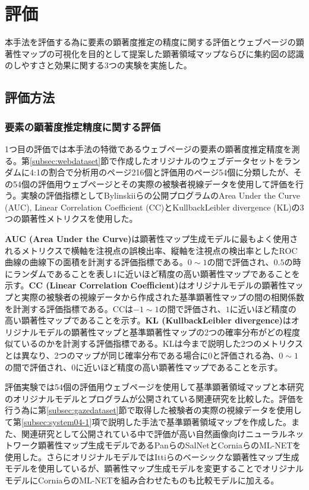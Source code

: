 \newpage
\renewcommand{\baselinestretch}{1.5}
\section{評価}\label{sec:evaluation}
\renewcommand{\baselinestretch}{1}
\par 本手法を評価する為に要素の顕著度推定の精度に関する評価とウェブページの顕著性マップの可視化を目的として提案した顕著領域マップならびに集約図の認識のしやすさと効果に関する3つの実験を実施した。

\subsection{評価方法}
\subsubsection{要素の顕著度推定精度に関する評価}
\par 1つ目の評価では本手法の特徴であるウェブページの要素の顕著度推定精度を測る。第\ref{subsec:webdataset}節で作成したオリジナルのウェブデータセットをランダムに4:1の割合で分析用のページ216個と評価用のページ54個に分類したが、その54個の評価用ウェブページとその実際の被験者視線データを使用して評価を行う。実験の評価指標としてBylinskiiらの公開プログラム\cite{salMetrics_Bylinskii}のArea Under the Curve (AUC), Linear Correlation Coefficient (CC)とKullback\-Leibler divergence (KL)の3つの顕著性メトリクスを使用した。

\par {\bf AUC (Area Under the Curve)}は顕著性マップ生成モデルに最もよく使用されるメトリクスで横軸を注視点の誤検出率、縦軸を注視点の検出率としたROC曲線の曲線下の面積を計測する評価指標である。$0\sim1$の間で評価され、$0.5$の時にランダムであることを表し$1$に近いほど精度の高い顕著性マップであることを示す。{\bf CC (Linear Correlation Coefficient)}はオリジナルモデルの顕著性マップと実際の被験者の視線データから作成された基準顕著性マップの間の相関係数を計測する評価指標である。CCは$-1\sim1$の間で評価され、$1$に近いほど精度の高い顕著性マップであることを示す。{\bf KL (Kullback\-Leibler divergence)}はオリジナルモデルの顕著性マップと基準顕著性マップの2つの確率分布がどの程度似ているのかを計測する評価指標である。KLは今まで説明した2つのメトリクスとは異なり、2つのマップが同じ確率分布である場合に$0$と評価される為、$0\sim1$の間で評価され、$0$に近いほど精度の高い顕著性マップであることを示す。

\par 評価実験では54個の評価用ウェブページを使用して基準顕著領域マップと本研究のオリジナルモデルとプログラムが公開されている関連研究を比較した。評価を行う為に第\ref{subsec:gazedataset}節で取得した被験者の実際の視線データを使用して第\ref{subsec:system04-1}項で説明した手法で基準顕著領域マップを作成した。また、関連研究として公開されている中で評価が高い自然画像向けニューラルネットワーク顕著性マップ生成モデルであるPanらのSalNet\cite{pan2016shallow}とCorniaらのML-NET\cite{mlnet2016}を使用した。さらにオリジナルモデルではIttiらのベーシックな顕著性マップ生成モデル\cite{itti1998model}を使用しているが、顕著性マップ生成モデルを変更することでオリジナルモデルにCorniaらのML-NET\cite{mlnet2016}を組み合わせたものも比較モデルに加える。


